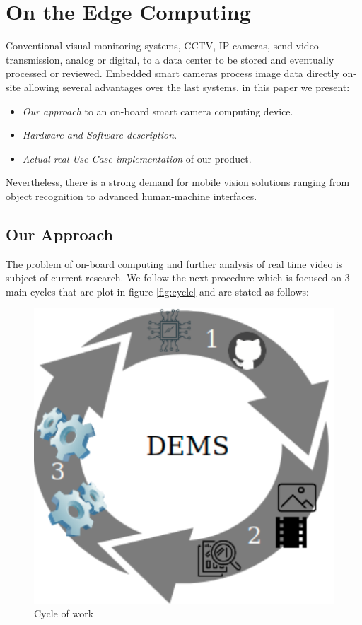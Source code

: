 \section{On the Edge Computing}

Conventional visual monitoring systems, CCTV, IP cameras, send video transmission, analog or digital, to a data center to be stored and eventually processed or reviewed. Embedded smart cameras process image data directly on-site allowing several advantages over the last systems, in this paper we present:

\begin{itemize}[noitemsep] %
\item \textit{Our approach} to an on-board smart camera computing device.
\item \textit{Hardware and Software description}.
\item \textit{Actual real Use Case implementation} of our product. 
\end{itemize}


Nevertheless, there is a strong demand for mobile vision solutions ranging from object recognition to advanced human-machine interfaces.

\subsection{Our Approach}

The problem of on-board computing and further analysis of real time video is subject of current research. We follow the next procedure which is focused on 3 main cycles that are plot in figure \ref{fig:cycle} and are stated as follows:

\begin{figure}[h]\centering
	\includegraphics[width=0.7\linewidth]{images/cycle}
	\caption{Cycle of work}
	\label{fig:cicle}
\end{figure}

